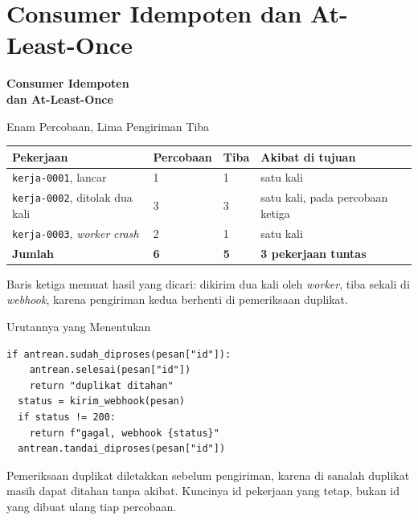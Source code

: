 \documentclass[aspectratio=169, table, 12pt]{beamer}
\begin{document}
\section{Consumer Idempoten dan At-Least-Once}

\begin{frame}{\hfill}
  \centering
  \Huge{\textbf{Consumer Idempoten\\dan At-Least-Once}}
\end{frame}

\begin{frame}{{\Large Enam Percobaan, Lima Pengiriman Tiba}}
  \vspace{6pt}
  \centering
  {\footnotesize
  \begin{tabularx}{\textwidth}{Ylll}
    \hline
    \textbf{Pekerjaan} & \textbf{Percobaan} & \textbf{Tiba} & \textbf{Akibat di tujuan} \\
    \hline
    \texttt{kerja-0001}, lancar & 1 & 1 & satu kali \\
    \hline
    \texttt{kerja-0002}, ditolak dua kali & 3 & 3 & satu kali, pada percobaan ketiga \\
    \hline
    \texttt{kerja-0003}, \textit{worker} \textit{crash} & 2 & 1 & satu kali \\
    \hline
    \textbf{Jumlah} & \textbf{6} & \textbf{5} & \textbf{3 pekerjaan tuntas} \\
    \hline
  \end{tabularx}}

  \vspace{6pt}
  {\small Baris ketiga memuat hasil yang dicari: dikirim dua kali oleh
  \textit{worker}, tiba sekali di \textit{webhook}, karena pengiriman kedua
  berhenti di pemeriksaan duplikat.}
\end{frame}

\begin{frame}[fragile]{{\Large Urutannya yang Menentukan}}
  \vspace{2pt}
\begin{lstlisting}[style=PythonStyle]
  if antrean.sudah_diproses(pesan["id"]):
    antrean.selesai(pesan["id"])
    return "duplikat ditahan"
  status = kirim_webhook(pesan)
  if status != 200:
    return f"gagal, webhook {status}"
  antrean.tandai_diproses(pesan["id"])
\end{lstlisting}
  \vspace{2pt}
  {\small Pemeriksaan duplikat diletakkan sebelum pengiriman, karena di
  sanalah duplikat masih dapat ditahan tanpa akibat. Kuncinya id pekerjaan
  yang tetap, bukan id yang dibuat ulang tiap percobaan.}
\end{frame}
\end{document}
